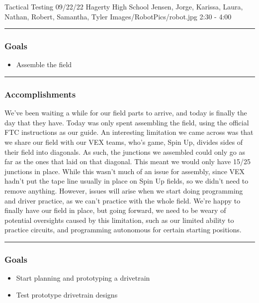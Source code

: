 \insertmeeting 

	{Tactical Testing} 
	{09/22/22}
	{Hagerty High School}
	{Jensen, Jorge, Karissa, Laura, Nathan, Robert, Samantha, Tyler}
	{Images/RobotPics/robot.jpg}
	{2:30 - 4:00}
	

\noindent\hfil\rule{\textwidth}{.4pt}\hfil
\subsubsection*{Goals}
\begin{itemize}
    \item Assemble the field

\end{itemize} 

\noindent\hfil\rule{\textwidth}{.4pt}\hfil

\subsubsection*{Accomplishments}
We've been waiting a while for our field parts to arrive, and today is finally the day that they have. Today was only spent assembling the field, using the official FTC instructions as our guide. An interesting limitation we came across was that we share our field with our VEX teams, who's game, Spin Up, divides sides of their field into diagonals. As such, the junctions we assembled could only go as far as the ones that laid on that diagonal. This meant we would only have 15/25 junctions in place. While this wasn't much of an issue for assembly, since VEX hadn't put the tape line usually in place on Spin Up fields, so we didn't need to remove anything. However, issues will arise when we start doing programming and driver practice, as we can't practice with the whole field. We're happy to finally have our field in place, but going forward, we need to be weary of potential oversights caused by this limitation, such as our limited ability to practice circuits, and programming autonomous for certain starting positions.


\noindent\hfil\rule{\textwidth}{.4pt}\hfil
\subsubsection*{Goals}
\begin{itemize}
    \item Start planning and prototyping a drivetrain
    \item Test prototype drivetrain designs
    
\end{itemize} 

